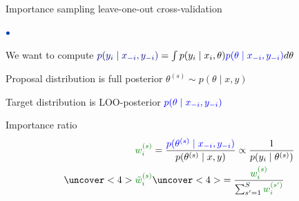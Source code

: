 \documentclass[english,t]{beamer}
\newenvironment{list1}{
   \begin{list}{$\color{list1}\bullet$}{\itemsep=6pt}}{
  \end{list}}
\begin{document}
\begin{frame}{Importance sampling leave-one-out cross-validation}

  \begin{list1}
  \item We want to compute ${\color{navyblue}p(y_i \mid x_{-i}, y_{-i})} = \int p(y_i \mid x_i,\theta){\color{blue} p(\theta \mid x_{-i}, y_{-i})} d\theta$
  \item<2-> Proposal distribution is full posterior $\theta^{(s)} \sim p(\theta \mid x,y)$
  \item<2-> Target distribution is LOO-posterior ${\color{blue} p(\theta \mid x_{-i}, y_{-i})}$
  \item<3-> Importance ratio
    \begin{align*}
    {\color{darkgreen} w_i^{(s)}} & = \frac{{\color{blue} p(\theta^{(s)} \mid x_{-i}, y_{-i})}}{p(\theta^{(s)} \mid x,y)}\propto \frac{1}{p(y_i \mid \theta^{(s)})}\\
      \uncover<4>{\color{darkgreen}\tilde{w}_i^{(s)}}&\uncover<4>{=\frac{{\color{darkgreen} w_i^{(s)}}}{\sum_{s'=1}^S {\color{darkgreen} w_i^{(s')}}}}
    \end{align*}
  \end{list1}

\end{frame}
\end{document}
